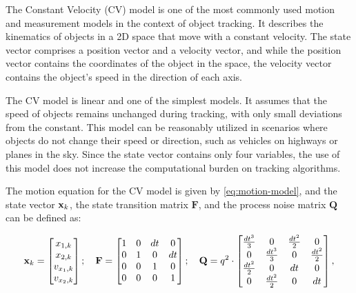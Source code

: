 The Constant Velocity (CV) model is one of the most commonly used motion and measurement models in the context of object tracking. It describes the kinematics of objects in a 2D space that move with a constant velocity. The state vector comprises a position vector and a velocity vector, and while the position vector contains the coordinates of the object in the space, the velocity vector contains the object's speed in the direction of each axis.

The CV model is linear and one of the simplest models. It assumes that the speed of objects remains unchanged during tracking, with only small deviations from the constant. This model can be reasonably utilized in scenarios where objects do not change their speed or direction, such as vehicles on highways or planes in the sky. Since the state vector contains only four variables, the use of this model does not increase the computational burden on tracking algorithms.

The motion equation for the CV model is given by \ref{eq:motion-model}, and the state vector $\vecat{x}{k}$, the state transition matrix $\mathbf{F}$, and the process noise matrix $\mathbf{Q}$ can be defined as:

\begin{equation}
    \vecat{x}{k} =
    \begin{bmatrix}
        x_{1,k} \\ 
        x_{2,k} \\ 
        v_{x_1,k} \\ 
        v_{x_2,k}
    \end{bmatrix};
    \quad
    \mathbf{F} =
    \begin{bmatrix}
       1 & 0 & dt & 0 \\
       0 & 1 & 0 & dt \\
       0 & 0 & 1 &  0 \\
       0 & 0 & 0 &  1 
    \end{bmatrix};
    \quad
    \mathbf{Q} = q^2 \cdot
    \begin{bmatrix}
        \frac{dt^3}{3}    & 0                 & \frac{dt^{2}}{2}  & 0  \\
        0                 & \frac{dt^3}{3}    & 0                 & \frac{dt^{2}}{2} \\
        \frac{dt^{2}}{2}  & 0                 & dt                & 0 \\
        0                 & \frac{dt^{2}}{2}  & 0                 & dt
    \end{bmatrix},
\end{equation}

